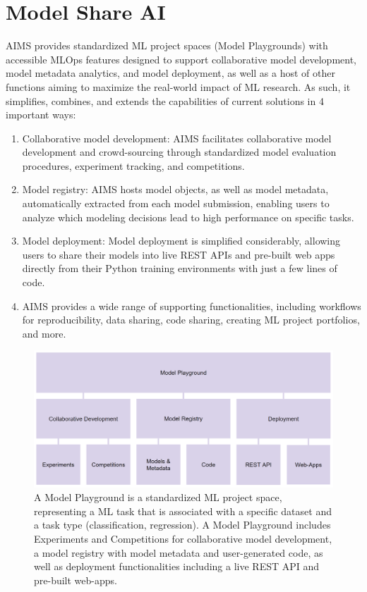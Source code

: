 \section{Model Share AI}
AIMS provides standardized ML project spaces (Model Playgrounds) with accessible MLOps features designed to support collaborative model development, model metadata analytics, and model deployment, as well as a host of other functions aiming to maximize the real-world impact of ML research. As such, it simplifies, combines, and extends the capabilities of current solutions in 4 important ways:

\begin{enumerate}
    \item Collaborative model development: AIMS facilitates collaborative model development and crowd-sourcing through standardized model evaluation procedures, experiment tracking, and competitions. 
    \item Model registry: AIMS hosts model objects, as well as model metadata, automatically extracted from each model submission, enabling users to analyze which modeling decisions lead to high performance on specific tasks.
    \item Model deployment: Model deployment is simplified considerably, allowing users to share their models into live REST APIs and pre-built web apps directly from their Python training environments with just a few lines of code.
    \item AIMS provides a wide range of supporting functionalities, including workflows for reproducibility, data sharing, code sharing, creating ML project portfolios, and more.
\end{enumerate}

\begin{figure}
  \centering
  \includegraphics[width=1\textwidth]{figures/fig_overview.png}
  \caption{A Model Playground is a standardized ML project space, representing a ML task that is associated with a specific dataset and a task type (classification, regression). A Model Playground includes Experiments and Competitions for collaborative model development, a model registry with model metadata and user-generated code, as well as deployment functionalities including a live REST API and pre-built web-apps.}
  \label{fig:fig_overview}
\end{figure}


